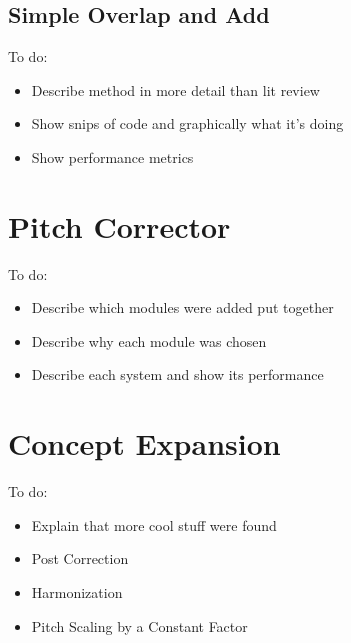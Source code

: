 \subsection{Simple Overlap and Add}

\color{red}
To do:
\begin{itemize}
	\item Describe method in more detail than lit review
	\item Show snips of code and graphically what it's doing
	\item Show performance metrics
\end{itemize}
\color{black}

\section{Pitch Corrector}

\color{red}
To do:
\begin{itemize}
	\item Describe which modules were added put together
	\item Describe why each module was chosen
	\item Describe each system and show its performance
\end{itemize}
\color{black}

\section{Concept Expansion}

\color{red}
To do:
\begin{itemize}
	\item Explain that more cool stuff were found
	\item Post Correction
	\item Harmonization
	\item Pitch Scaling by a Constant Factor
\end{itemize}
\color{black}

